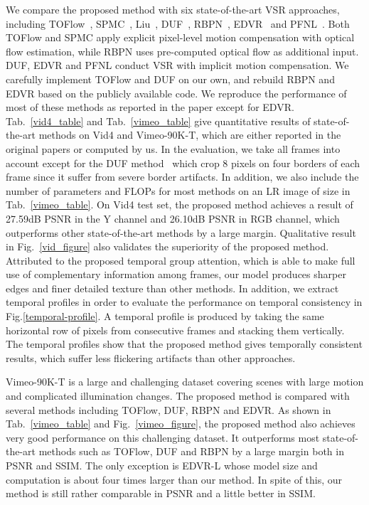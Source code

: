 We compare the proposed method with six state-of-the-art VSR approaches, including TOFlow~\cite{xue2019video}, SPMC~\cite{tao2017detail}, Liu~\cite{liu2017robust}, DUF~\cite{jo2018deep}, RBPN~\cite{haris2019recurrent}, EDVR~\cite{wang2019edvr} and PFNL~\cite{yi2019progressive}. Both TOFlow and SPMC apply 
explicit pixel-level motion compensation with optical flow estimation, while RBPN uses pre-computed optical flow as additional input. DUF, EDVR and PFNL conduct VSR with implicit motion compensation. We carefully implement TOFlow and DUF on our own, and rebuild RBPN and EDVR based on the publicly available code. We reproduce the performance of most of these methods as reported in the paper except for EDVR. 
Tab.~\ref{vid4_table} and Tab.~\ref{vimeo_table} give quantitative results of state-of-the-art methods on Vid4 and Vimeo-90K-T, which are either reported in the original papers or computed by us. In the evaluation, we take all frames into account except for the DUF method~\cite{jo2018deep} which crop 8 pixels on four borders of each frame since it suffer from severe border artifacts. In addition, we also include the number of parameters and FLOPs for most methods on an LR image of size  in Tab.~\ref{vimeo_table}. 
On Vid4 test set, the proposed method achieves a result of 27.59dB PSNR in the Y channel and 26.10dB PSNR in RGB channel, which outperforms other state-of-the-art methods by a large margin. 
Qualitative result in Fig.~\ref{vid_figure} also validates the superiority of the proposed method. Attributed to the proposed temporal group attention, which is able to make full use of complementary information among frames, our model produces sharper edges and finer detailed texture than other methods.
In addition, we extract temporal profiles in order to evaluate the performance on temporal consistency in Fig.\ref{temporal-profile}. A temporal profile is produced by taking the same horizontal row of pixels from consecutive frames and stacking them vertically. The temporal profiles show that the proposed method gives temporally consistent results, which suffer less flickering artifacts than other approaches.

Vimeo-90K-T is a large and challenging dataset covering scenes with large motion and complicated illumination changes. The proposed method is compared with several methods including TOFlow, DUF, RBPN and EDVR. 
As shown in Tab.~\ref{vimeo_table} and Fig.~\ref{vimeo_figure}, the proposed method also achieves very good performance on this challenging dataset. It outperforms most state-of-the-art methods such as TOFlow, DUF and RBPN by a large margin both in PSNR and SSIM. The only exception is EDVR-L whose model size and computation is about four times larger than our method. In spite of this, our method is still rather comparable in PSNR and a little better in SSIM.

